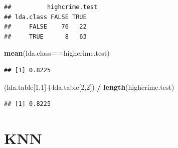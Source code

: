 \documentclass[
]{article}
\newenvironment{Shaded}{\begin{snugshade}}{\end{snugshade}}
\newcommand{\DecValTok}[1]{\textcolor[rgb]{0.00,0.00,0.81}{#1}}
\newcommand{\KeywordTok}[1]{\textcolor[rgb]{0.13,0.29,0.53}{\textbf{#1}}}
\newcommand{\NormalTok}[1]{#1}
\newcommand{\OperatorTok}[1]{\textcolor[rgb]{0.81,0.36,0.00}{\textbf{#1}}}
\newcommand{\StringTok}[1]{\textcolor[rgb]{0.31,0.60,0.02}{#1}}
\begin{document}
\begin{Shaded}
\end{Shaded}

\begin{verbatim}
##          highcrime.test
## lda.class FALSE TRUE
##     FALSE    76   22
##     TRUE      8   63
\end{verbatim}

\begin{Shaded}
\begin{Highlighting}[]
\KeywordTok{mean}\NormalTok{(lda.class}\OperatorTok{==}\NormalTok{highcrime.test)}
\end{Highlighting}
\end{Shaded}

\begin{verbatim}
## [1] 0.8225
\end{verbatim}

\begin{Shaded}
\begin{Highlighting}[]
\NormalTok{(lda.table[}\DecValTok{1}\NormalTok{,}\DecValTok{1}\NormalTok{]}\OperatorTok{+}\NormalTok{lda.table[}\DecValTok{2}\NormalTok{,}\DecValTok{2}\NormalTok{]) }\OperatorTok{/}\StringTok{ }\KeywordTok{length}\NormalTok{(highcrime.test)}
\end{Highlighting}
\end{Shaded}

\begin{verbatim}
## [1] 0.8225
\end{verbatim}

\hypertarget{knn}{%
\section{KNN}\label{knn}}

\begin{Shaded}
\end{Shaded}
\end{document}
